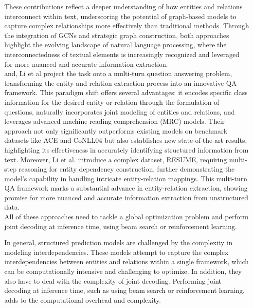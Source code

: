 These contributions reflect a deeper understanding of how entities and relations interconnect within text, underscoring the potential of graph-based models to capture complex relationships more effectively than traditional methods. Through the integration of GCNs and strategic graph construction, both approaches highlight the evolving landscape of natural language processing, where the interconnectedness of textual elements is increasingly recognized and leveraged for more nuanced and accurate information extraction.\\

and, Li et al\cite{li-etal-2019-entity} project the task onto a multi-turn question answering problem, transforming the entity and relation extraction process into an innovative QA framework. This paradigm shift offers several advantages: it encodes specific class information for the desired entity or relation through the formulation of questions, naturally incorporates joint modeling of entities and relations, and leverages advanced machine reading comprehension (MRC) models. Their approach not only significantly outperforms existing models on benchmark datasets like ACE and CoNLL04 but also establishes new state-of-the-art results, highlighting its effectiveness in accurately identifying structured information from text. Moreover, Li et al. introduce a complex dataset, RESUME, requiring multi-step reasoning for entity dependency construction, further demonstrating the model's capability in handling intricate entity-relation mappings. This multi-turn QA framework marks a substantial advance in entity-relation extraction, showing promise for more nuanced and accurate information extraction from unstructured data.\\
All of these approaches need to tackle a global optimization problem and perform joint decoding at inference time, using beam search or reinforcement learning.

In general, structured prediction models are challenged by the complexity in modeling interdependencies. These models attempt to capture the complex interdependencies between entities and relations within a single framework, which can be computationally intensive and challenging to optimize. In addition, they also have to deal with the complexity of joint decoding. Performing joint decoding at inference time, such as using beam search or reinforcement learning, adds to the computational overhead and complexity.


